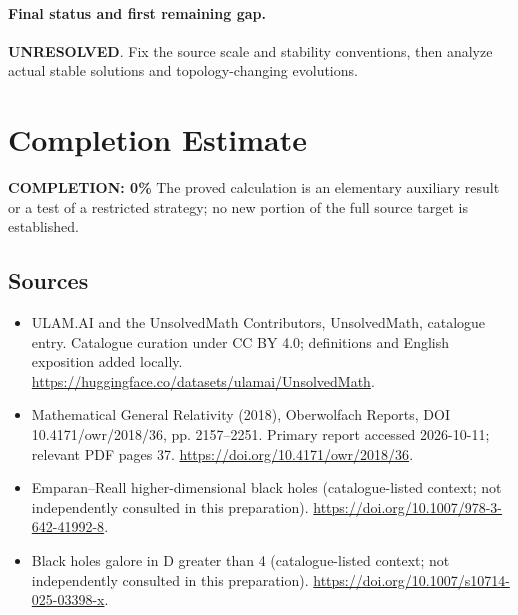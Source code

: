 \documentclass[11pt]{article}
\begin{document}
\paragraph{Final status and first remaining gap.}
\textbf{UNRESOLVED}. Fix the source scale and stability conventions, then analyze actual stable solutions and topology-changing evolutions.

\section{Completion Estimate}
\noindent\textbf{COMPLETION: 0\%}
The proved calculation is an elementary auxiliary result or a test of a restricted strategy; no new portion of the full source target is established.

\subsection{Sources}
\begin{itemize}
\item[\hypertarget{source:statement:1}{S1}] ULAM.AI and the UnsolvedMath Contributors, UnsolvedMath, catalogue entry. Catalogue curation under CC BY 4.0; definitions and English exposition added locally.
\url{https://huggingface.co/datasets/ulamai/UnsolvedMath}.
\item[\hypertarget{source:statement:2}{S2}] Mathematical General Relativity (2018), Oberwolfach Reports, DOI 10.4171/owr/2018/36, pp. 2157--2251. Primary report accessed 2026-10-11; relevant PDF pages 37.
\url{https://doi.org/10.4171/owr/2018/36}.
\item[\hypertarget{source:statement:3}{S3}] Emparan--Reall higher-dimensional black holes (catalogue-listed context; not independently consulted in this preparation).
\url{https://doi.org/10.1007/978-3-642-41992-8}.
\item[\hypertarget{source:statement:4}{S4}] Black holes galore in D greater than 4 (catalogue-listed context; not independently consulted in this preparation).
\url{https://doi.org/10.1007/s10714-025-03398-x}.
\end{itemize}
\label{end:statement}
\end{document}
